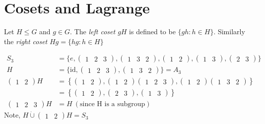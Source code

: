 
\hypertarget{cosets-and-lagrange}{%
\section{Cosets and Lagrange}\label{cosets-and-lagrange}}

\begin{definition}
Let \(H \leq G\) and \(g \in G\).
The \emph{left coset \(gH\)} is defined to be \(\{ gh : h \in H \}\).
Similarly the \emph{right coset} \(Hg = \{ hg : h \in H \}\)
\end{definition}

\begin{example}
\begin{align*}
    S_3 &= \{ e, \begin{pmatrix}1 & 2 & 3\end{pmatrix}, \begin{pmatrix}1 & 3 & 2\end{pmatrix}, \begin{pmatrix}1 & 2\end{pmatrix}, \begin{pmatrix}1 & 3\end{pmatrix}, \begin{pmatrix}2 & 3\end{pmatrix} \} \\
    H &= \{ \text{id}, \begin{pmatrix}1 & 2 & 3\end{pmatrix}, \begin{pmatrix}1 & 3 & 2\end{pmatrix} \} = A_3 \\
    \begin{pmatrix}1 & 2\end{pmatrix}H &= \left\{ \begin{pmatrix}1 & 2\end{pmatrix}, \begin{pmatrix}1 & 2\end{pmatrix}\begin{pmatrix}1 & 2 & 3\end{pmatrix}, \begin{pmatrix}1 & 2\end{pmatrix}\begin{pmatrix}1 & 3 & 2\end{pmatrix} \right\} \\
    &= \left\{ \begin{pmatrix}1 & 2\end{pmatrix}, \begin{pmatrix}2 & 3\end{pmatrix}, \begin{pmatrix}1 & 3\end{pmatrix} \right\} \\
    \begin{pmatrix}1 & 2 & 3\end{pmatrix}H &= H \ (\text{since H is a subgroup})
\end{align*}
Note, \(H \dot{\cup} \begin{pmatrix}1 & 2\end{pmatrix}H = S_3\)
\end{example}

